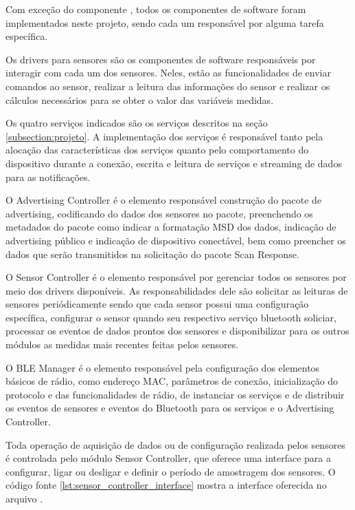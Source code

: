 Com exceção do componente , todos os componentes de
software foram implementados neste projeto, sendo cada um responsável por alguma
tarefa específica.

Os drivers para sensores são os componentes de software responsáveis por
interagir com cada um dos sensores. Neles, estão as funcionalidades de enviar
comandos ao sensor, realizar a leitura das informações do sensor e realizar os
cálculos necessários para se obter o valor das variáveis medidas.

Os quatro serviços indicados são os serviços descritos na seção
\ref{subsection:projeto}. A implementação dos serviços é responsável tanto pela
alocação das características dos serviços quanto pelo comportamento do
dispositivo durante a conexão, escrita e leitura de serviços e streaming de
dados para as notificações.

O Advertising Controller é o elemento responsável construção do pacote de
advertising, codificando do dados dos sensores no pacote, preenchendo os
metadados do pacote como indicar a formatação MSD dos dados, indicação de
advertising público e indicação de dispositivo conectável, bem como preencher os
dados que serão transmitidos na solicitação do pacote Scan Response.

O Sensor Controller é o elemento responsável por gerenciar todos os sensores por
meio dos drivers disponíveis. As responsabilidades dele são solicitar as
leituras de sensores periódicamente sendo que cada sensor possui uma
configuração específica, configurar o sensor quando seu respectivo serviço
bluetooth soliciar, processar os eventos de dados prontos dos sensores e
disponibilizar para os outros módulos as medidas mais recentes feitas
pelos sensores.

O BLE Manager é o elemento responsável pela configuração dos elementos básicos
de rádio, como endereço MAC, parâmetros de conexão, inicialização do protocolo e
das funcionalidades de rádio, de instanciar os serviços e de distribuir os
eventos de sensores e eventos do Bluetooth para os serviços e o Advertising
Controller.


Toda operação de aquisição de dados ou de configuração realizada pelos sensores
é controlada pelo módulo Sensor Controller, que oferece uma interface para a
configurar, ligar ou desligar e definir o período de amostragem dos sensores. O
código fonte \ref{lst:sensor_controller_interface} mostra a interface oferecida
no arquivo .
 
